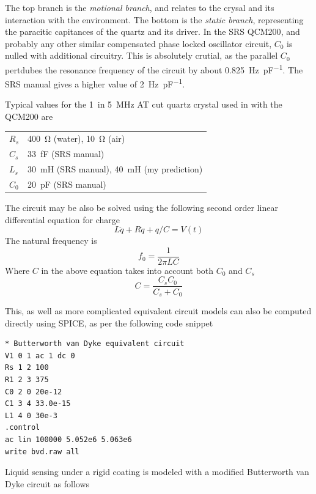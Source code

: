 \documentclass[a4paper,titlepage,onecolumn]{report}
\begin{document}
The top branch is the \textit{motional branch}, and relates to the crysal
and its interaction with the environment.  The bottom is the \textit{static
branch}, representing the paracitic capitances of the quartz and its driver.
In the SRS QCM200\cite{srsqcmmanual}, and probably any other similar
compensated phase locked oscillator circuit, $C_0$ is nulled with
additional circuitry.  This is absolutely crutial, as the parallel $C_0$ 
pertdubes the resonance frequency of the circuit by about
\SI{0.825}{\hertz\per\pico\farad}.  The SRS manual gives a higher value
of \SI{2}{\hertz\per\pico\farad}.

Typical values for the \SI{1}{in} \SI{5}{\mega\hertz} AT cut quartz
crystal used in with the QCM200\cite{srsqcmmanual} are

\begin{table}[h]
\begin{tabular}{ll}
 $R_s$ & \SI{400}{\ohm} (water), \SI{10}{\ohm} (air) \\
 $C_s$ & \SI{33}{\femto\farad} (SRS manual)\\
 $L_s$ & \SI{30}{\milli\henry} (SRS manual), \SI{40}{\milli\henry} (my prediction) \\
 $C_0$ & \SI{20}{\pico\farad} (SRS manual)
\end{tabular}
\end{table}

The circuit may be also be solved using the following second order linear
differential equation for charge
\begin{equation}
 L\ddot{q}+R\dot{q}+q/C = V(t)
\end{equation}
The natural frequency is 
\begin{equation}
 f_0 = \frac{1}{2 \pi L C}
\end{equation}
Where $C$ in the above equation takes into account both $C_0$ and $C_s$
\begin{equation}
 C = \frac{C_s C_0}{C_s + C_0}
\end{equation}

This, as well as more complicated equivalent circuit models can also be
computed directly using SPICE, as per the following code snippet
\begin{verbatim}
* Butterworth van Dyke equivalent circuit
V1 0 1 ac 1 dc 0
Rs 1 2 100
R1 2 3 375
C0 2 0 20e-12
C1 3 4 33.0e-15
L1 4 0 30e-3
.control
ac lin 100000 5.052e6 5.063e6
write bvd.raw all
\end{verbatim}

Liquid sensing under a rigid coating is modeled with a modified Butterworth
van Dyke circuit as follows 
\end{document}
